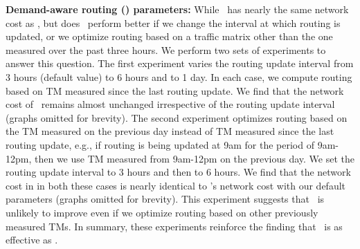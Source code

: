 \textbf{Demand-aware routing (\optlru) parameters:} While \optlru\ has nearly the same network cost as \invlru, but does \optlru\ perform better if we change the interval at which routing is updated, or we optimize routing based on a traffic matrix other than the one measured over the past three hours.  We perform two sets of experiments to answer this question. The first experiment varies the routing update interval from 3 hours (default value) to 6 hours and to  1 day. In each case, we compute routing based on TM measured since the last routing update.  We find that the network cost of \optlru\ remains almost unchanged irrespective of the routing update interval (graphs omitted for brevity). The  second experiment  optimizes routing based on the TM measured on the previous day instead of TM measured since the last routing update, e.g., if routing is being updated at 9am for the period of 9am-12pm, then we use TM measured from 9am-12pm on the previous day.  We set the routing update interval to 3 hours and then to 6 hours. We find that the network cost in in both these cases is nearly identical to \optlru's network cost with our default parameters (graphs omitted for brevity). This experiment suggests that \optlru\ is unlikely to improve even if we optimize routing based on other previously measured TMs.  In summary, these experiments reinforce the finding that \invlru\ is as effective as \optlru.



